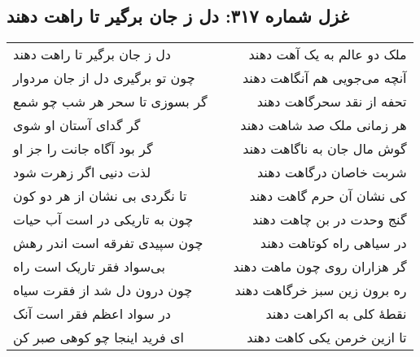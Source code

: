 \begin{center}
\section*{غزل شماره ۳۱۷: دل ز جان برگیر تا راهت دهند}
\label{sec:317}
\begin{longtable}{l p{0.5cm} r}
دل ز جان برگیر تا راهت دهند
&&
ملک دو عالم به یک آهت دهند
\\
چون تو برگیری دل از جان مردوار
&&
آنچه می‌جویی هم آنگاهت دهند
\\
گر بسوزی تا سحر هر شب چو شمع
&&
تحفه از نقد سحرگاهت دهند
\\
گر گدای آستان او شوی
&&
هر زمانی ملک صد شاهت دهند
\\
گر بود آگاه جانت را جز او
&&
گوش مال جان به ناگاهت دهند
\\
لذت دنیی اگر زهرت شود
&&
شربت خاصان درگاهت دهند
\\
تا نگردی بی نشان از هر دو کون
&&
کی نشان آن حرم گاهت دهند
\\
چون به تاریکی در است آب حیات
&&
گنج وحدت در بن چاهت دهند
\\
چون سپیدی تفرقه است اندر رهش
&&
در سیاهی راه کوتاهت دهند
\\
بی‌سواد فقر تاریک است راه
&&
گر هزاران روی چون ماهت دهند
\\
چون درون دل شد از فقرت سیاه
&&
ره برون زین سبز خرگاهت دهند
\\
در سواد اعظم فقر است آنک
&&
نقطهٔ کلی به اکراهت دهند
\\
ای فرید اینجا چو کوهی صبر کن
&&
تا ازین خرمن یکی کاهت دهند
\\
\end{longtable}
\end{center}
